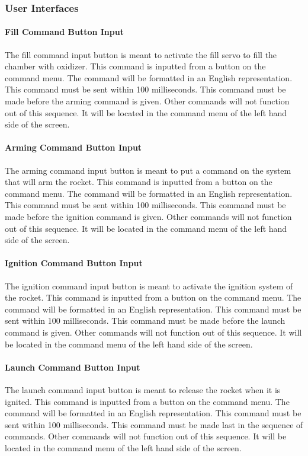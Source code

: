 \documentclass[10pt,draftclsnofoot,onecolumn,compsoc]{IEEEtran}
\begin{document}
\subsubsection{ User Interfaces}
\paragraph {\bf Fill Command Button Input}
The fill command input button is meant to activate the fill servo to fill the chamber with oxidizer. This command is inputted from a button on the command menu. The command will be formatted in an English representation.  This command must be sent within 100 milliseconds. This command must be made before the arming command is given. Other commands will not function out of this sequence. It will be located in the command menu of the left hand side of the screen.

\paragraph{\bf Arming Command Button Input}
The arming command input button is meant to put a command on the system that will arm the rocket. This command is inputted from a button on the command menu. The command will be formatted in an English representation.  This command must be sent within 100 milliseconds. This command must be made before the ignition command is given. Other commands will not function out of this sequence. It will be located in the command menu of the left hand side of the screen.
\paragraph{\bf Ignition Command Button Input}
The ignition command input button is meant to activate the ignition system of the rocket. This command is inputted from a button on the command menu. The command will be formatted in an English representation.  This command must be sent within 100 milliseconds. This command must be made before the launch command is given. Other commands will not function out of this sequence. It will be located in the command menu of the left hand side of the screen.
\paragraph{\bf Launch Command Button Input}
The launch command input button is meant to release the rocket when it is ignited. This command is inputted from a button on the command menu. The command will be formatted in an English representation.  This command must be sent within 100 milliseconds. This command must be made last in the sequence of commands. Other commands will not function out of this sequence. It will be located in the command menu of the left hand side of the screen.
\end{document}
